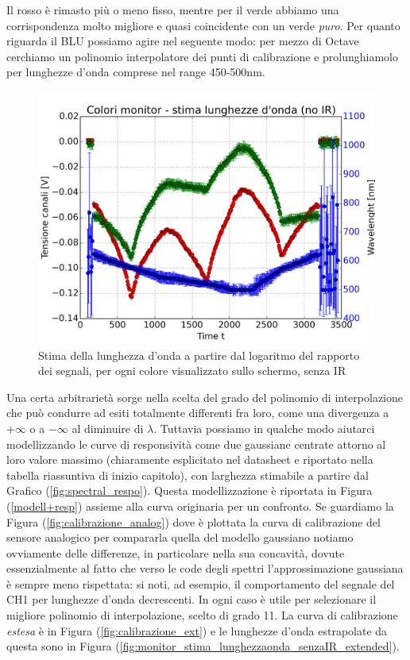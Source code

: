 \documentclass[10pt,letterpaper]{article}
\begin{document}
Il rosso è rimasto più o meno fisso, mentre per il verde abbiamo una corrispondenza molto migliore e quasi coincidente con un verde \textit{puro}. Per quanto riguarda il BLU possiamo agire nel seguente modo: per mezzo di Octave cerchiamo un polinomio interpolatore dei punti di calibrazione e prolunghiamolo per lunghezze d'onda comprese nel range 450-500nm.\\

 
\begin{figure}
\centering
\includegraphics[width=0.7\linewidth]{./monitor_stima_lunghezzaonda_senzaIR}
\caption{Stima della lunghezza d'onda a partire dal logaritmo del rapporto dei segnali, per ogni colore visualizzato sullo schermo, senza IR}
\label{fig:monitor_stima_lunghezzaonda_senzaIR}
\end{figure}


Una certa arbitrarietà sorge nella scelta del grado del polinomio di interpolazione che può condurre ad esiti totalmente differenti fra loro, come una divergenza a $+ \infty$ o a $- \infty$ al diminuire di $\lambda$. Tuttavia possiamo in qualche modo aiutarci modellizzando le curve di responsività come due gaussiane centrate attorno al loro valore massimo (chiaramente esplicitato nel datasheet e riportato nella tabella riassuntiva di inizio capitolo), con larghezza stimabile a partire dal Grafico (\ref{fig:spectral_respo}). Questa modellizzazione è riportata in Figura (\ref{modell+resp}) assieme alla curva originaria per un confronto. Se guardiamo la Figura (\ref{fig:calibrazione_analog}) dove è plottata la curva di calibrazione del sensore analogico per compararla quella del modello gaussiano notiamo ovviamente delle differenze, in particolare nella sua concavità, dovute essenzialmente al fatto che verso le code degli spettri l'approssimazione gaussiana è sempre meno rispettata: si noti, ad esempio, il comportamento del segnale del CH1 per lunghezze d'onda decrescenti. In ogni caso è utile per selezionare il migliore polinomio di interpolazione, scelto di grado 11. La curva di calibrazione \textit{estesa} è in Figura (\ref{fig:calibrazione_ext}) e le lunghezze d'onda estrapolate da questa sono in Figura (\ref{fig:monitor_stima_lunghezzaonda_senzaIR_extended}). \\
\end{document}
